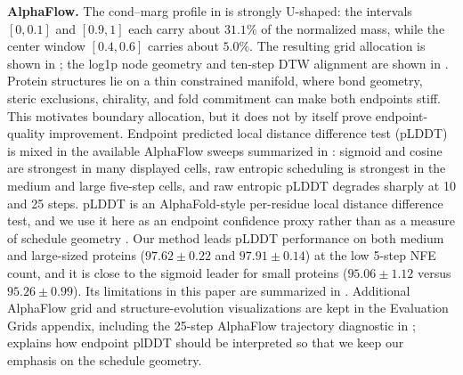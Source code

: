 \documentclass{article}
\theoremstyle{plain}
\theoremstyle{definition}
\theoremstyle{remark}
\begin{document}

\textbf{AlphaFlow.} The cond--marg profile in  is strongly U-shaped: the intervals $[0,0.1]$ and $[0.9,1]$ each carry about $31.1\%$ of the normalized mass, while the center window $[0.4,0.6]$ carries about $5.0\%$.    The resulting grid allocation is shown in ; the log1p node geometry and ten-step DTW alignment are shown in . Protein structures lie on a thin constrained manifold, where bond geometry, steric exclusions, chirality, and fold commitment can make both endpoints stiff. This motivates boundary allocation, but it does not by itself prove endpoint-quality improvement. Endpoint predicted local distance difference test (pLDDT) is mixed in the available AlphaFlow sweeps summarized in : sigmoid and cosine are strongest in many displayed cells, raw entropic scheduling is strongest in the medium and large five-step cells, and raw entropic pLDDT degrades sharply at 10 and 25 steps. pLDDT is an AlphaFold-style per-residue local distance difference test, and we use it here as an endpoint confidence proxy rather than as a measure of schedule geometry \citep{jumper2021,mariani2013lddt}. Our method leads pLDDT performance on both medium and large-sized proteins ($97.62\pm0.22$ and $97.91\pm0.14$) at the low 5-step NFE count, and it is close to the sigmoid leader for small proteins ($95.06\pm1.12$ versus $95.26\pm0.99$). Its limitations in this paper are summarized in .  Additional AlphaFlow grid and structure-evolution visualizations are kept in the Evaluation Grids appendix, including the 25-step AlphaFlow trajectory diagnostic in ;  explains how endpoint plDDT should be interpreted so that we keep our emphasis on the schedule geometry.


\end{document}
